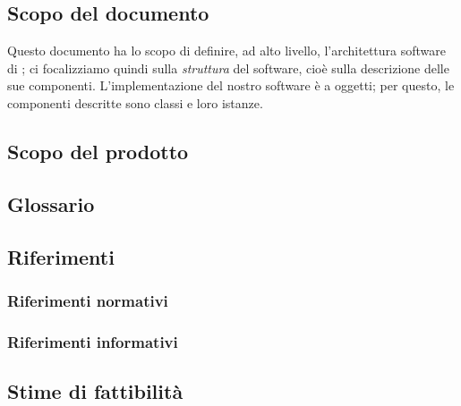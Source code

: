 
\subsection{Scopo del documento}
Questo documento ha lo scopo di definire, ad alto livello, l'architettura software di \proj; ci focalizziamo quindi sulla \emph{struttura} del software, cioè sulla descrizione delle sue componenti. L'implementazione del nostro software è a oggetti; per questo, le componenti descritte sono classi e loro istanze.


\subsection{Scopo del prodotto}
\scopo

\subsection{Glossario}
\presgloss

\subsection{Riferimenti} \label{sec:ref}

\subsubsection{Riferimenti normativi}

\subsubsection{Riferimenti informativi}

\subsection{Stime di fattibilità}
